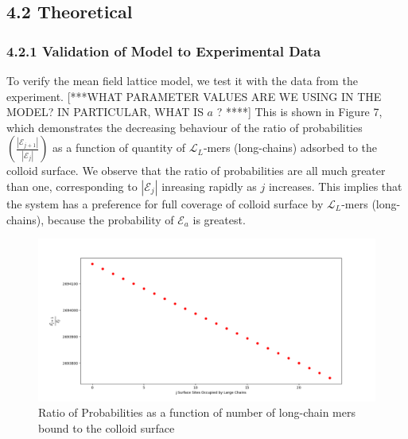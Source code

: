\documentclass[journal=mamobx,manuscript=article]{achemso}
\newcommand{\leng}{\mathcal{L}}
\begin{document}
\subsection{4.2 Theoretical}

\subsubsection{4.2.1 Validation of Model to Experimental Data}

To verify the mean field lattice model, we test it with the data from the experiment. [***WHAT PARAMETER VALUES ARE WE USING
IN THE MODEL?  IN PARTICULAR, WHAT IS $a$ ? ****]
This is shown in Figure 7, which demonstrates the decreasing behaviour of the ratio of probabilities 
$\left(\frac{|\mathcal{E}_{j+1}|}{|\mathcal{E}_j|}\right)$ as a function of quantity of $\leng_L$-mers (long-chains) adsorbed to the colloid surface. We observe that the ratio of probabilities %
are all much
greater than one, corresponding to $|\mathcal{E}_j|$ 
inreasing rapidly as $j$ increases.
This implies that the system has a preference for full coverage of colloid surface by $\leng_L$-mers (long-chains), because the probability of $\mathcal{E}_a$ is greatest.


\begin{figure}[H]
\includegraphics[scale=0.50]{fig11.png}
\caption{Ratio of Probabilities as a function of number of long-chain mers bound to the colloid surface}
\label{figure 11}
\end{figure}

\end{document}
